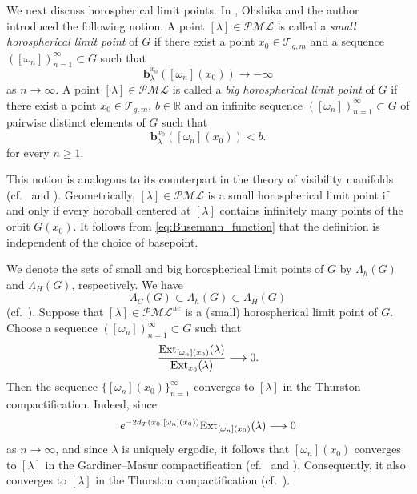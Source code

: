 \documentclass[dvipdfmx]{amsart}
\theoremstyle{remark}
\newcommand{\ext}{{\rm Ext}}
\newcommand{\teich}{\mathcal{T}}
\newcommand{\pml}{\mathcal{PML}}
\newcommand{\busemann}{\boldsymbol{b}}
\begin{document}
We next discuss horospherical limit points. In \cite{miyachi2026limitsetsmappingclass}, Ohshika and the author introduced the following notion. A point $[\lambda]\in\pml$ is called a \emph{small horospherical limit point} of $G$ if there exist a point $x_0\in\teich_{g,m}$ and a sequence $([\omega_n])_{n=1}^\infty\subset G$ such that
\begin{equation}
\label{eq:small-horo_definition}
\busemann^{x_0}_\lambda([\omega_n](x_0))\longrightarrow-\infty
\end{equation}
as $n\to\infty$. 
A point $[\lambda]\in\pml$ is called a \emph{big horospherical limit point} of $G$ if there exist a point $x_0\in\teich_{g,m}$, $b\in \mathbb{R}$ and an infinite sequence $([\omega_n])_{n=1}^\infty\subset G$ of pairwise distinct elements of $G$ such that
\begin{equation}
\label{eq:big_horo_definition}
\busemann^{x_0}_\lambda([\omega_n](x_0))<b.
\end{equation}
for every $n\ge 1$. 

This notion is analogous to its counterpart in the theory of visibility manifolds (cf.\ \cite[\S3]{EberleinONeill1973} and \cite[Section IV]{Sullivan1981}). Geometrically, $[\lambda]\in\pml$ is a small horospherical limit point if and only if every horoball centered at $[\lambda]$ contains infinitely many points of the orbit $G(x_0)$. It follows from \eqref{eq:Busemann_function} that the definition is independent of the choice of basepoint.

We denote the sets of small and big horospherical limit points of $G$ by $\Lambda_h(G)$ and $\Lambda_H(G)$, respectively. We have
\[
\Lambda_C(G)\subset\Lambda_h(G)\subset \Lambda_H(G)
\]
(cf.\ \cite{miyachi2025functiontheorydynamicsergodic}). Suppose that $[\lambda]\in\pml^{ue}$ is a (small) horospherical limit point of $G$. Choose a sequence $([\omega_n])_{n=1}^\infty\subset G$ such that
\begin{equation}
\frac{\ext_{[\omega_n](x_0)}(\lambda)}
{\ext_{x_0}(\lambda)}
\longrightarrow 0.
\end{equation}
Then the sequence $\{[\omega_n](x_0)\}_{n=1}^\infty$ converges to $[\lambda]$ in the Thurston compactification. Indeed, since
\begin{equation*}
e^{-2d_T(x_0,[\omega_n](x_0))}
\ext_{[\omega_n](x_0)}(\lambda)
\longrightarrow 0
\end{equation*}
as $n\to\infty$, and since $\lambda$ is uniquely ergodic, it follows that $[\omega_n](x_0)$ converges to $[\lambda]$ in the Gardiner--Masur compactification (cf.\ \cite[Theorem 1.1]{Miyachi2008} and \cite[Theorem 3]{Miyachi2013}). Consequently, it also converges to $[\lambda]$ in the Thurston compactification (cf.\ \cite[Corollary 1]{Miyachi2013}).
\end{document}
